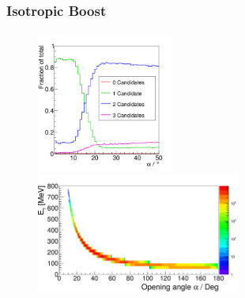 \documentclass[slidestop,compress,mathserif]{beamer}
\begin{document}
\begin{frame}
\frametitle{Isotropic Boost}


\begin{figure}
	\includegraphics[width=0.40\textwidth]{Pictures/MCClusteringCheck_nCandsOpAng}
	\includegraphics[width=0.60\textwidth]{Pictures/20172804TrueOpeningAngle}
	
\end{figure}

\end{frame}
\end{document}
